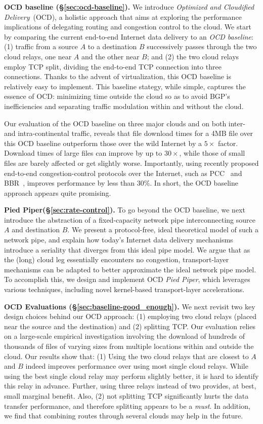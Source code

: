 \documentclass[newfonts=false,format=sigconf,10pt,letterpaper]{acmart}
\newcommand{\T}[1]{\smallskip\noindent\textbf{#1}} %
\newcommand{\name}{Pied Piper\xspace}
\begin{document}
\T{OCD baseline (\S\ref{sec:ocd-baseline}).} We introduce \textit{Optimized and Cloudified Delivery}~(OCD), a holistic approach that aims at exploring the performance  implications  of delegating routing and congestion control to the cloud. We start by comparing the current end-to-end Internet data delivery to an \textit{OCD baseline}: (1) traffic from a source $A$ to a destination $B$ successively passes through the two cloud relays, one near $A$ and the other near $B$; and (2) the two cloud relays employ TCP split, dividing the end-to-end TCP connection into three connections. Thanks to the advent of virtualization, this OCD baseline is relatively easy to implement. This baseline stategy, while simple, captures the essence of OCD: minimizing time outside the cloud so as to avoid BGP's inefficiencies and separating traffic modulation within and without the cloud.

Our evaluation of the OCD baseline on three major clouds and on both inter- and intra-continental traffic, reveals that file download times for a 4MB file over this OCD baseline outperform those over the wild Internet by a $5\times$ factor. Download times of large files can improve by up to $30\times$, while those of small files are barely affected or get slightly worse. Importantly, using recently proposed end-to-end congestion-control protocols over the Internet, such as PCC~\cite{PCC} and BBR~\cite{BBR}, improves performance by less than $30\%$. In short, the OCD baseline approach appears quite promising. 

\T{\name (\S\ref{sec:rate-control}).} To go beyond the OCD baseline, we next introduce the abstraction of a fixed-capacity network pipe interconnecting source $A$ and destination $B$. We present a protocol-free, ideal theoretical model of such a network pipe, and explain how today's Internet data delivery mechanisms introduce a seriality that diverges from this ideal pipe model. We argue that as the (long) cloud leg essentially encounters no congestion, transport-layer mechanisms can be adapted to better approximate the ideal network pipe model. To accomplish this, we design and implement OCD \textit{\name}, which leverages various techniques, including novel kernel-based transport-layer accelerations. 

\T{OCD Evaluations (\S\ref{sec:baseline-good_enough}).} We next revisit two key design choices behind our OCD approach: (1) employing two cloud relays (placed near the source and the destination) and (2) splitting TCP. Our evaluation relies on a large-scale empirical
investigation involving the download of hundreds of thousands of files of
varying sizes from multiple locations within and outside the cloud. Our results
show that: (1) Using the two cloud relays that are closest to $A$ and $B$ indeed improves performance over using most single cloud relays. While using the best single cloud relay may perform slightly better, it is hard to identify this relay in advance. Further, using three relays instead of two provides, at best, small marginal benefit. Also, (2) not splitting TCP significantly hurts the data transfer performance, and therefore splitting appears to be a \textit{must}. In addition, we find that combining routes through several clouds may help in the future.
\end{document}
